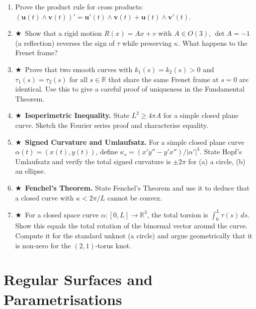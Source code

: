 \documentclass[11pt, a4paper]{article}
\newcommand{\R}{\mathbb{R}}
\newcommand{\kp}{\kappa}
\newcommand{\tp}{\tau}
\newcommand{\hard}{$\bigstar$\ }
\begin{document}
\begin{enumerate}[label=\textbf{Q\arabic*.}, leftmargin=*, itemsep=6pt]
\item Prove the product rule for cross products: $(\mathbf{u}(t)\wedge\mathbf{v}(t))'=\mathbf{u}'(t)\wedge\mathbf{v}(t)+\mathbf{u}(t)\wedge\mathbf{v}'(t)$.

\item \hard Show that a rigid motion $R(x)=Ax+v$ with $A\in O(3)$, $\det A=-1$ (a reflection) reverses the sign of $\tp$ while preserving $\kp$. What happens to the Frenet frame?

\item \hard Prove that two smooth curves with $k_1(s)=k_2(s)>0$ and $\tau_1(s)=\tau_2(s)$ for all $s\in\R$ that share the same Frenet frame at $s=0$ are identical. Use this to give a careful proof of uniqueness in the Fundamental Theorem.

\item \hard \textbf{Isoperimetric Inequality.} State $L^2\geq 4\pi A$ for a simple closed plane curve. Sketch the Fourier series proof and characterise equality.

\item \hard \textbf{Signed Curvature and Umlaufsatz.} For a simple closed plane curve $\alpha(t)=(x(t),y(t))$, define $\kp_s=(x'y''-y'x'')/|\alpha'|^3$. State Hopf's Umlaufsatz and verify the total signed curvature is $\pm 2\pi$ for (a) a circle, (b) an ellipse.

\item \hard \textbf{Fenchel's Theorem.} State Fenchel's Theorem and use it to deduce that a closed curve with $\kp<2\pi/L$ cannot be convex.

\item \hard For a closed space curve $\alpha:[0,L]\to\R^3$, the total torsion is $\int_0^L\tp(s)\,ds$. Show this equals the total rotation of the binormal vector around the curve. Compute it for the standard unknot (a circle) and argue geometrically that it is non-zero for the $(2,1)$-torus knot.

\end{enumerate}

\section{Regular Surfaces and Parametrisations}
\end{document}
